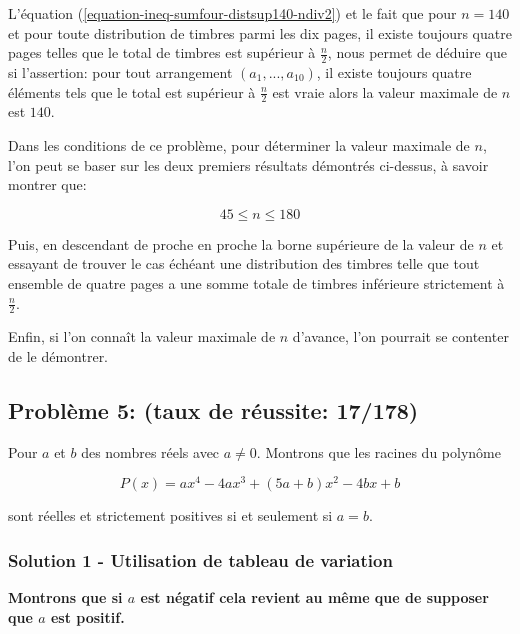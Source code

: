 \documentclass[12pt,a4paper,article]{memoir}
\begin{document}
L'équation (\ref{equation-ineq-sumfour-distsup140-ndiv2}) et le fait que pour $n=140$ et pour toute distribution de timbres parmi les dix pages, il existe toujours quatre pages telles que le total de timbres est supérieur à $\frac{n}{2}$, nous permet de déduire que si l'assertion: pour tout arrangement $(a_{1}, ..., a_{10})$, il existe toujours quatre éléments tels que le total est supérieur à $\frac{n}{2}$ est vraie alors la valeur maximale de $n$ est $140$.

\begin{myremark}[colback=red!5!white,colframe=blue!75!black,mytitle={Comment trouver la valeur maximale de $n$}, label=rmthr]
Dans les conditions de ce problème, pour déterminer la valeur maximale de $n$, l'on peut se baser sur les deux premiers résultats démontrés ci-dessus, à savoir montrer que:

\[45 \leq n \leq 180\]

Puis, en descendant de proche en proche la borne supérieure de la valeur de $n$ et essayant de trouver le cas échéant une distribution des timbres telle que tout ensemble de quatre pages a une somme totale de timbres inférieure strictement à $\frac{n}{2}$.

\bigskip

Enfin, si l'on connaît la valeur maximale de $n$ d'avance, l'on pourrait se contenter de le démontrer.
\end{myremark}

\subsection{Problème 5: (taux de réussite: 17/178)}
Pour $a$ et $b$ des nombres réels avec $a \neq 0$. Montrons que les racines du polynôme

\begin{equation}
P(x) = ax^4 - 4ax^3 + (5a + b)x^2 - 4bx + b
\label{equation-pb-5-sol}
\end{equation}

sont réelles et strictement positives si et seulement si $a=b$.

\subsubsection{Solution 1 - Utilisation de tableau de variation}

\textbf{Montrons que si $a$ est négatif cela revient au même que de supposer que $a$ est positif.}

\bigskip
\end{document}
